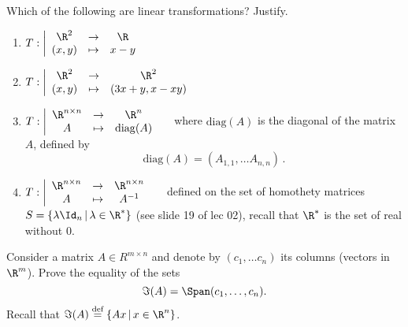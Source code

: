 \documentclass[11pt,nocut]{article}
\begin{document}



\vspace{1cm}

\begin{problem}[2 points]
	Which of the following are linear transformations? Justify.
	\begin{enumerate}[label=\normalfont(\textbf{\alph*})]
		\item 
			$\displaystyle
			T: \left| 
			\begin{array}{ccc}
				\R^2 & \to & \R \\
				(x,y) & \mapsto & x-y
			\end{array}
		\right.
		$
	\item 
            $\displaystyle
            T: \left| 
            \begin{array}{ccc}
                \R^2 & \to & \R^2 \\
                (x,y) & \mapsto & (3x + y, x - xy)
            \end{array}
        \right.
        $
	\item 
			$\displaystyle
			T: \left| 
			\begin{array}{ccc}
				\R^{n \times n} & \to & \R^n \\
				A & \mapsto & \mathrm{diag}(A)
			\end{array}
		\right.\quad$ where $\mathrm{diag}(A)$ is the diagonal of the matrix $A$, defined by 
		$$\mathrm{diag}(A) = (A_{1,1}, \dots A_{n,n}) \,.$$
    \item 
        $\displaystyle
        T: \left| 
        \begin{array}{ccc}
            \R^{n \times n} & \to & \R^{n \times n}\\
            A & \mapsto & A^{-1}
        \end{array}
    \right.\quad$ defined on the set of homothety matrices $S = \{ \lambda \Id_n \, | \, \lambda \in \R^* \}$ (see slide 19 of lec 02), recall that $\R^*$ is the set of real without $0$. 
	\end{enumerate}
\end{problem}

\vspace{5mm}
\begin{problem}
	Consider a matrix $A \in R^{m \times n}$ and denote by $(c_1, \dots c_n)$ its columns (vectors in $\R^m$). Prove the equality of the sets 
	$$
	\Im(A)  = \Span(c_1, \dots, c_n).
	$$
	Recall that $\Im(A) \stackrel{\text{def}}{=}
	\{ Ax \, | \, x \in \R^n \}$.
\end{problem}
\end{document}
